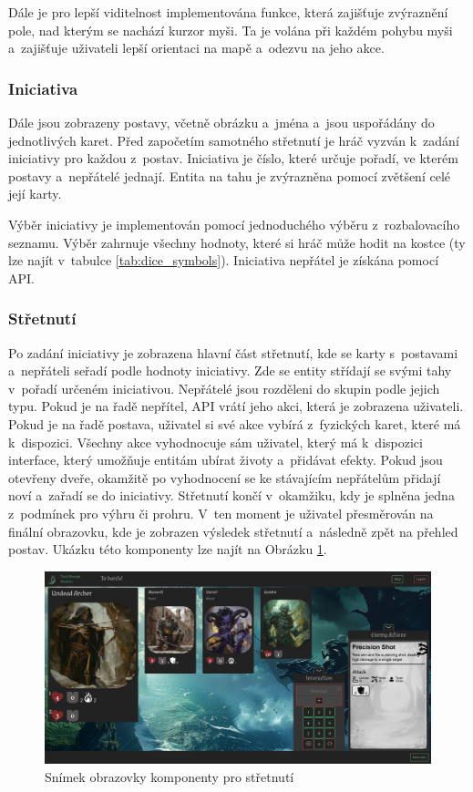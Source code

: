 Dále je pro lepší viditelnost implementována funkce, která zajišťuje zvýraznění pole, nad kterým se nachází kurzor myši. Ta je volána při každém pohybu myši a~zajišťuje uživateli lepší orientaci na mapě a~odezvu na jeho akce.

\subsubsection*{Iniciativa}
Dále jsou zobrazeny postavy, včetně obrázku a~jména a~jsou uspořádány do jednotlivých karet. Před započetím samotného střetnutí je hráč vyzván k~zadání iniciativy pro každou z~postav. Iniciativa je číslo, které určuje pořadí, ve kterém postavy a~nepřátelé jednají. Entita na tahu je zvýrazněna pomocí zvětšení celé její karty.

Výběr iniciativy je implementován pomocí jednoduchého výběru z~rozbalovacího seznamu. Výběr zahrnuje všechny hodnoty, které si hráč může hodit na kostce (ty lze najít v~tabulce \ref{tab:dice_symbols}). Iniciativa nepřátel je získána pomocí API.

\subsubsection*{Střetnutí}
Po zadání iniciativy je zobrazena hlavní část střetnutí, kde se karty s~postavami a~nepřáteli seřadí podle hodnoty iniciativy. Zde se entity střídají se svými tahy v~pořadí určeném iniciativou. Nepřátelé jsou rozděleni do skupin podle jejich typu. Pokud je na řadě nepřítel, API vrátí jeho akci, která je zobrazena uživateli. Pokud je na řadě postava, uživatel si své akce vybírá z~fyzických karet, které má k~dispozici. Všechny akce vyhodnocuje sám uživatel, který má k~dispozici interface, který umožňuje entitám ubírat životy a~přidávat efekty. Pokud jsou otevřeny dveře, okamžitě po vyhodnocení se ke stávajícím nepřátelům přidají noví a~zařadí se do iniciativy. Střetnutí končí v~okamžiku, kdy je splněna jedna z~podmínek pro výhru či prohru. V~ten moment je uživatel přesměrován na finální obrazovku, kde je zobrazen výsledek střetnutí a~následně zpět na přehled postav. Ukázku této komponenty lze najít na Obrázku \ref{fig:combat}.

\begin{figure}[H]
  \centering
  \includegraphics[width=\textwidth]{resources/figures/TTS-Encounter.png}
  \caption{Snímek obrazovky komponenty pro střetnutí}
  \label{fig:combat}
\end{figure}

